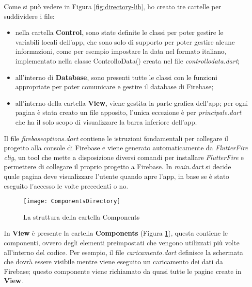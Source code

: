 Come si può vedere in Figura \ref{fig:directory-lib}, ho creato tre cartelle per suddividere i file:
\begin{itemize}
    \item nella cartella \textbf{Control}, sono state definite le classi per poter gestire le variabili locali dell'app, che sono solo di supporto per poter gestire alcune informazioni, come per esempio impostare la data nel formato italiano, implementato nella classe ControlloData() creata nel file \emph{controllo\textunderscore  data.dart};
    \item all'interno di \textbf{Database}, sono presenti tutte le classi con le funzioni appropriate per poter comunicare e gestire il database di Firebase;
    \item all'interno della cartella \textbf{View}, viene gestita la parte grafica dell'app; per ogni pagina è stata creato un file apposito, l'unica eccezione è per \emph{principale.dart} che ha il solo scopo di visualizzare la barra inferiore dell'app.
\end{itemize}
Il file \emph{firebase\textunderscore options.dart} contiene le istruzioni fondamentali per collegare il progetto alla console di Firebase e viene generato automaticamente da \emph{FlutterFire \gls{clig}\glsfirstoccur}, un tool che mette a disposizione diversi comandi per installare \emph{FlutterFire} e permettere di collegare il proprio progetto a Firebase.\newline
In \emph{main.dart} si decide quale pagina deve visualizzare l'utente quando apre l'app, in base se è stato eseguito l'accesso le volte precedenti o no.
\begin{figure}[!h] 
    \centering 
    \texttt{[image: ComponentsDirectory]} 
    \caption{La struttura della cartella Components}
    \label{fig:directory-components}
\end{figure}

In \textbf{View} è presente la cartella \textbf{Components} (Figura \ref{fig:directory-components}), questa contiene le componenti, ovvero degli elementi preimpostati che vengono utilizzati più volte all'interno del codice.\newline
Per esempio, il file \emph{caricamento.dart} definisce la schermata che dovrà essere visibile mentre viene eseguito un caricamento dei dati da Firebase; questo componente viene richiamato da quasi tutte le pagine create in \textbf{View}.

\newpage

